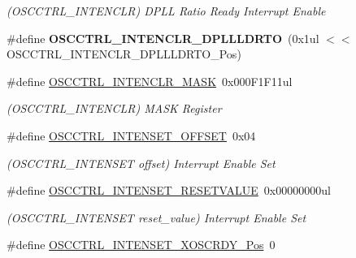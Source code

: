 \begin{DoxyCompactItemize}
\begin{DoxyCompactList}\small\item\em (O\+S\+C\+C\+T\+R\+L\+\_\+\+I\+N\+T\+E\+N\+C\+L\+R) D\+P\+L\+L Ratio Ready Interrupt Enable \end{DoxyCompactList}\item 
\hypertarget{group___s_a_m_l21___o_s_c_c_t_r_l_gab90f23d95fb1404aa6276e3a92a21d35}{}\#define {\bfseries O\+S\+C\+C\+T\+R\+L\+\_\+\+I\+N\+T\+E\+N\+C\+L\+R\+\_\+\+D\+P\+L\+L\+L\+D\+R\+T\+O}~(0x1ul $<$$<$ O\+S\+C\+C\+T\+R\+L\+\_\+\+I\+N\+T\+E\+N\+C\+L\+R\+\_\+\+D\+P\+L\+L\+L\+D\+R\+T\+O\+\_\+\+Pos)\label{group___s_a_m_l21___o_s_c_c_t_r_l_gab90f23d95fb1404aa6276e3a92a21d35}

\item 
\hypertarget{group___s_a_m_l21___o_s_c_c_t_r_l_ga491d06abacebcf79ae6c8ab2ce06fc03}{}\#define \hyperlink{group___s_a_m_l21___o_s_c_c_t_r_l_ga491d06abacebcf79ae6c8ab2ce06fc03}{O\+S\+C\+C\+T\+R\+L\+\_\+\+I\+N\+T\+E\+N\+C\+L\+R\+\_\+\+M\+A\+S\+K}~0x000\+F1\+F11ul\label{group___s_a_m_l21___o_s_c_c_t_r_l_ga491d06abacebcf79ae6c8ab2ce06fc03}

\begin{DoxyCompactList}\small\item\em (O\+S\+C\+C\+T\+R\+L\+\_\+\+I\+N\+T\+E\+N\+C\+L\+R) M\+A\+S\+K Register \end{DoxyCompactList}\item 
\hypertarget{group___s_a_m_l21___o_s_c_c_t_r_l_gac255483d2540447cf58a2ff1c9227c4c}{}\#define \hyperlink{group___s_a_m_l21___o_s_c_c_t_r_l_gac255483d2540447cf58a2ff1c9227c4c}{O\+S\+C\+C\+T\+R\+L\+\_\+\+I\+N\+T\+E\+N\+S\+E\+T\+\_\+\+O\+F\+F\+S\+E\+T}~0x04\label{group___s_a_m_l21___o_s_c_c_t_r_l_gac255483d2540447cf58a2ff1c9227c4c}

\begin{DoxyCompactList}\small\item\em (O\+S\+C\+C\+T\+R\+L\+\_\+\+I\+N\+T\+E\+N\+S\+E\+T offset) Interrupt Enable Set \end{DoxyCompactList}\item 
\hypertarget{group___s_a_m_l21___o_s_c_c_t_r_l_ga59a8baa4ba504f85756373bebf779abd}{}\#define \hyperlink{group___s_a_m_l21___o_s_c_c_t_r_l_ga59a8baa4ba504f85756373bebf779abd}{O\+S\+C\+C\+T\+R\+L\+\_\+\+I\+N\+T\+E\+N\+S\+E\+T\+\_\+\+R\+E\+S\+E\+T\+V\+A\+L\+U\+E}~0x00000000ul\label{group___s_a_m_l21___o_s_c_c_t_r_l_ga59a8baa4ba504f85756373bebf779abd}

\begin{DoxyCompactList}\small\item\em (O\+S\+C\+C\+T\+R\+L\+\_\+\+I\+N\+T\+E\+N\+S\+E\+T reset\+\_\+value) Interrupt Enable Set \end{DoxyCompactList}\item 
\hypertarget{group___s_a_m_l21___o_s_c_c_t_r_l_ga51f8fe67474d300dae1f69f7877fcb21}{}\#define \hyperlink{group___s_a_m_l21___o_s_c_c_t_r_l_ga51f8fe67474d300dae1f69f7877fcb21}{O\+S\+C\+C\+T\+R\+L\+\_\+\+I\+N\+T\+E\+N\+S\+E\+T\+\_\+\+X\+O\+S\+C\+R\+D\+Y\+\_\+\+Pos}~0\label{group___s_a_m_l21___o_s_c_c_t_r_l_ga51f8fe67474d300dae1f69f7877fcb21}


\end{DoxyCompactItemize}
